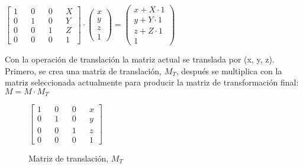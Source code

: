 \begin{minipage}{0.3\textwidth}
  \centering
\end{minipage}\begin{minipage}[t]{0.5\textwidth}
  \centering
  \(
  \begin{bmatrix}
    1 && 0 && 0 && X\\
    0 && 1 && 0 && Y\\
    0 && 0 && 1 && Z\\
    0 && 0 && 0 && 1
  \end{bmatrix}
  \cdot
  \begin{pmatrix}
    x \\ y \\ z \\ 1
  \end{pmatrix}
  =
  \begin{pmatrix}
    x + X \cdot 1 \\
    y + Y \cdot 1 \\
    z + Z \cdot 1 \\
    1
  \end{pmatrix}
  \)
\end{minipage}

\newpage


Con la operación de translación la matriz actual se translada por (x, y, z). Primero, se crea una matriz de translación, $M_T$, después se multiplica con la matriz seleccionada actualmente para producir la matriz de transformación final: $M = M \cdot M_T$
\begin{figure} [h!]
  \centering
  \(
  \begin{bmatrix}
    1 && 0 && 0 && x\\
    0 && 1 && 0 && y\\
    0 && 0 && 1 && z\\
    0 && 0 && 0 && 1
  \end{bmatrix}
  \)
  \caption{Matriz de translación, $M_T$}
\end{figure}

